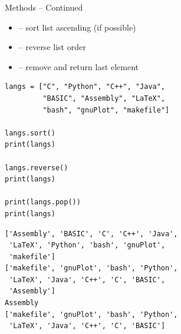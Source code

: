 \begin{frame}[fragile]
%
\begin{Large}
Methods -- Continued
\vspace{6pt}
\end{Large}
\begin{itemize}
\item {} -- sort list ascending (if possible)
\item {} -- reverse list order
\item {} -- remove and return last element
\end{itemize}
%
\begin{tcbraster}[raster columns=2,
                  raster equal height,
                  nobeforeafter,
                  raster column skip=0.5cm]
\begin{codebox}
\begin{verbatim}
langs = ["C", "Python", "C++", "Java",
         "BASIC", "Assembly", "LaTeX",
         "bash", "gnuPlot", "makefile"]

langs.sort()
print(langs)

langs.reverse()
print(langs)

print(langs.pop())
print(langs)
\end{verbatim}
\end{codebox}
%
\begin{cmdbox}
\begin{verbatim}
['Assembly', 'BASIC', 'C', 'C++', 'Java', 
 'LaTeX', 'Python', 'bash', 'gnuPlot', 
 'makefile']
['makefile', 'gnuPlot', 'bash', 'Python',
 'LaTeX', 'Java', 'C++', 'C', 'BASIC',
 'Assembly']
Assembly
['makefile', 'gnuPlot', 'bash', 'Python',
 'LaTeX', 'Java', 'C++', 'C', 'BASIC']

\end{verbatim}
\end{cmdbox}
\end{tcbraster}
%
\end{frame}